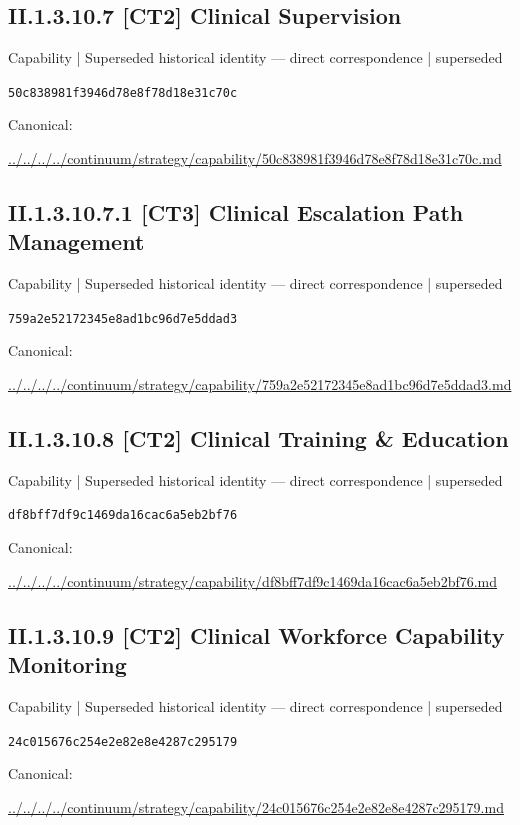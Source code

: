 \documentclass[10pt,a4paper]{article}
\begin{document}
\subsection*{II.1.3.10.7 [CT2] Clinical Supervision}
{\small Capability | Superseded historical identity — direct correspondence | superseded}\par
\texttt{50c838981f3946d78e8f78d18e31c70c}\par
Canonical: \par
{\footnotesize\url{../../../../continuum/strategy/capability/50c838981f3946d78e8f78d18e31c70c.md}}\par
\subsection*{II.1.3.10.7.1 [CT3] Clinical Escalation Path Management}
{\small Capability | Superseded historical identity — direct correspondence | superseded}\par
\texttt{759a2e52172345e8ad1bc96d7e5ddad3}\par
Canonical: \par
{\footnotesize\url{../../../../continuum/strategy/capability/759a2e52172345e8ad1bc96d7e5ddad3.md}}\par
\subsection*{II.1.3.10.8 [CT2] Clinical Training \& Education}
{\small Capability | Superseded historical identity — direct correspondence | superseded}\par
\texttt{df8bff7df9c1469da16cac6a5eb2bf76}\par
Canonical: \par
{\footnotesize\url{../../../../continuum/strategy/capability/df8bff7df9c1469da16cac6a5eb2bf76.md}}\par
\subsection*{II.1.3.10.9 [CT2] Clinical Workforce Capability Monitoring}
{\small Capability | Superseded historical identity — direct correspondence | superseded}\par
\texttt{24c015676c254e2e82e8e4287c295179}\par
Canonical: \par
{\footnotesize\url{../../../../continuum/strategy/capability/24c015676c254e2e82e8e4287c295179.md}}\par
\end{document}
